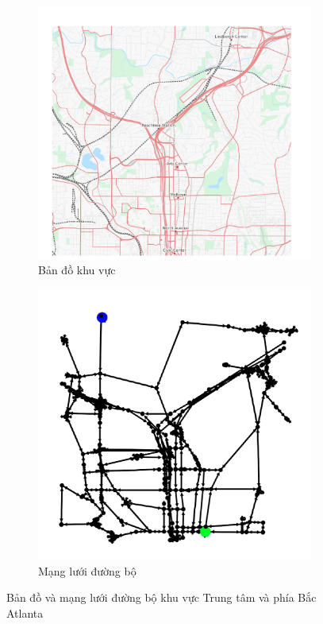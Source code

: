 \documentclass[../main.tex]{subfiles}
\begin{document}
\begin{figure}
    \centering
    \begin{subfigure}{0.45\textwidth}
        \centering
        \includegraphics{edited-images/Figure14a.jpg}
        \caption{Bản đồ khu vực}
        \label{fig:14a}
    \end{subfigure}
    \begin{subfigure}{0.45\textwidth}
        \centering
        \includegraphics{edited-images/Figure14b.jpg}
        \caption{Mạng lưới đường bộ}
        \label{fig:14b}
    \end{subfigure}
    \caption{Bản đồ và mạng lưới đường bộ khu vực Trung tâm và phía Bắc Atlanta}
    \label{fig:14}
\end{figure}
\end{document}
